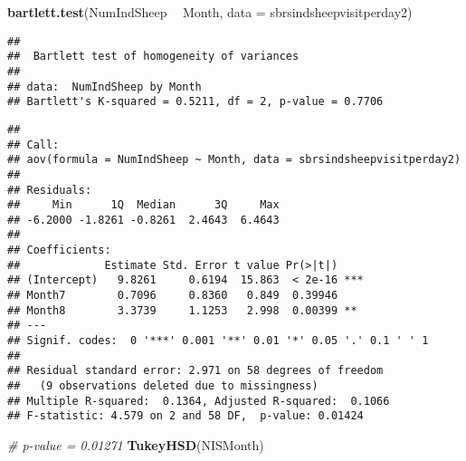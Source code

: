 \documentclass[]{article}
\newenvironment{Shaded}{\begin{snugshade}}{\end{snugshade}}
\newcommand{\CommentTok}[1]{\textcolor[rgb]{0.56,0.35,0.01}{\textit{#1}}}
\newcommand{\DataTypeTok}[1]{\textcolor[rgb]{0.13,0.29,0.53}{#1}}
\newcommand{\KeywordTok}[1]{\textcolor[rgb]{0.13,0.29,0.53}{\textbf{#1}}}
\newcommand{\NormalTok}[1]{#1}
\newcommand{\OperatorTok}[1]{\textcolor[rgb]{0.81,0.36,0.00}{\textbf{#1}}}
\newcommand{\StringTok}[1]{\textcolor[rgb]{0.31,0.60,0.02}{#1}}
\begin{document}
\begin{Shaded}
\begin{Highlighting}[]
\KeywordTok{bartlett.test}\NormalTok{(NumIndSheep }\OperatorTok{~}\StringTok{ }\NormalTok{Month, }\DataTypeTok{data =}\NormalTok{ sbrsindsheepvisitperday2)}
\end{Highlighting}
\end{Shaded}

\begin{verbatim}
## 
##  Bartlett test of homogeneity of variances
## 
## data:  NumIndSheep by Month
## Bartlett's K-squared = 0.5211, df = 2, p-value = 0.7706
\end{verbatim}

\begin{Shaded}
\end{Shaded}

\begin{verbatim}
## 
## Call:
## aov(formula = NumIndSheep ~ Month, data = sbrsindsheepvisitperday2)
## 
## Residuals:
##     Min      1Q  Median      3Q     Max 
## -6.2000 -1.8261 -0.8261  2.4643  6.4643 
## 
## Coefficients:
##             Estimate Std. Error t value Pr(>|t|)    
## (Intercept)   9.8261     0.6194  15.863  < 2e-16 ***
## Month7        0.7096     0.8360   0.849  0.39946    
## Month8        3.3739     1.1253   2.998  0.00399 ** 
## ---
## Signif. codes:  0 '***' 0.001 '**' 0.01 '*' 0.05 '.' 0.1 ' ' 1
## 
## Residual standard error: 2.971 on 58 degrees of freedom
##   (9 observations deleted due to missingness)
## Multiple R-squared:  0.1364, Adjusted R-squared:  0.1066 
## F-statistic: 4.579 on 2 and 58 DF,  p-value: 0.01424
\end{verbatim}

\begin{Shaded}
\begin{Highlighting}[]
\CommentTok{# p-value = 0.01271}
\KeywordTok{TukeyHSD}\NormalTok{(NISMonth)}
\end{Highlighting}
\end{Shaded}
\end{document}
